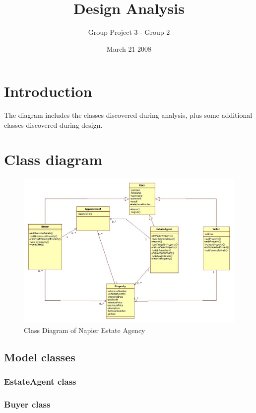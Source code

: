 \documentclass[a4paper,12pt]{article}
\title{Design Analysis}
\author{Group Project 3 - Group 2}
\date{March 21 2008}
\begin{document}
\maketitle
\newpage
\tableofcontents
\newpage



\section{Introduction}
The diagram includes the classes discovered during analysis, plus some additional classes discovered during design.


\section{Class diagram}
\begin{figure}[htbp]
\begin{center}
\includegraphics[width=\linewidth]{pics/classDiagram.jpg}
\end{center}
\caption{\footnotesize Class Diagram of Napier Estate Agency}
\end{figure}
\subsection {Model classes}

\subsubsection{EstateAgent class}

\subsubsection{Buyer class}
\end{document}
